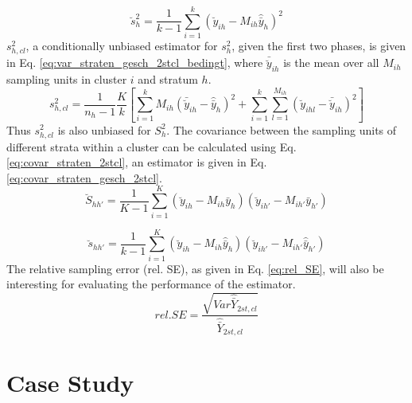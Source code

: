 \begin{equation}
 \breve{s}_h^2=\frac{1}{k-1}\sum_{i=1}^k\left(\breve{y}_{ih}-M_{ih}\hat{\bar{y}}_h\right)^2
\label{eq:var_straten_gesch_2stcl}
\end{equation}
$s_{h,cl}^2$, a conditionally unbiased estimator for $s_h^2$, given the first two phases, is given in Eq. \ref{eq:var_straten_gesch_2stcl_bedingt}, where $\bar{\breve{y}}_{ih}$ is the mean over all $M_{ih}$ sampling units in cluster $i$ and stratum $h$.
\begin{equation}
s_{h,cl}^2=\frac{1}{n_h-1}\frac{K}{k}\left[\sum_{i=1}^k M_{ih}\left(\bar{\breve{y}}_{ih}-\hat{\bar{y}}_h\right)^2+\sum_{i=1}^k\sum_{l=1}^{M_{ih}}\left(\breve{y}_{ihl}-\bar{\breve{y}}_{ih}\right)^2\right]
\label{eq:var_straten_gesch_2stcl_bedingt}
\end{equation}
Thus $s_{h,cl}^2$ is also unbiased for $S_{h}^2$. The covariance between the sampling units of different strata within a cluster can be calculated using Eq. \ref{eq:covar_straten_2stcl}, an estimator is given in Eq. \ref{eq:covar_straten_gesch_2stcl}.
\begin{equation}
 \breve{S}_{hh'}=\frac{1}{K-1}\sum_{i=1}^K\left(\breve{y}_{ih}-M_{ih}\bar{y}_h\right)\left(\breve{y}_{ih'}-M_{ih'}\bar{y}_{h'}\right)
\label{eq:covar_straten_2stcl}
\end{equation}

\begin{equation}
 \breve{s}_{hh'}=\frac{1}{k-1}\sum_{i=1}^K\left(\breve{y}_{ih}-M_{ih}\hat{\bar{y}}_h\right)\left(\breve{y}_{ih'}-M_{ih'}\hat{\bar{y}}_{h'}\right)
\label{eq:covar_straten_gesch_2stcl}
\end{equation}
The relative sampling error (rel. SE), as given in Eq. \ref{eq:rel_SE}, will also be interesting for evaluating the performance of the estimator. 
\begin{equation}
rel. SE=\frac{\sqrt{Var\hat{\bar{Y}}_{2st,cl}}}{\hat{\bar{Y}}_{2st,cl}}
\label{eq:rel_SE}
\end{equation}

\section{Case Study}
